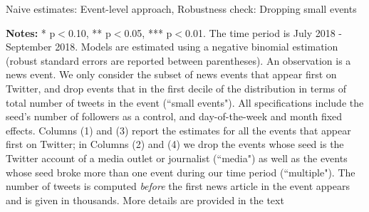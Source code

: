 \clearpage
\pagebreak
\begin{table}
\caption{Naive estimates: Event-level approach, Robustness check: Dropping small events}
\begin{center}
	
\end{center}
\begin{spacing}{0.5}
	{\fns \textbf{Notes:} * p$<$0.10, ** p$<$0.05, *** p$<$0.01. The time period is July 2018 - September 2018.  Models are estimated using a negative binomial estimation (robust standard errors are reported between parentheses). An observation is a news event. We only consider the subset of news events that appear first on Twitter, and drop events that in the first decile of the distribution in terms of total number of tweets in the event (``small events"). All specifications include the seed's number of followers as a control, and day-of-the-week and month fixed effects. Columns (1) and (3) report the estimates for all the events that appear first on Twitter; in Columns (2) and (4) we drop the events whose seed is the Twitter account of a media outlet or journalist (``media") as well as the events whose seed broke more than one event during our time period (``multiple"). The number of tweets is computed \textit{before} the first news article in the event appears and is given in thousands. More details are provided in the text} 
\end{spacing}
\label{Tab:number_articles_negbinomial_event_RDropSmallEvents}
\end{table} 


